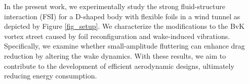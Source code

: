 \documentclass[a4paper,11pt]{article}
\begin{document}
	
	In the present work, we experimentally study the strong fluid-structure interaction (FSI) for a D-shaped body with flexible foils in a wind tunnel as depicted by Figure \ref{fig_setup}. We characterize the modifications to the BvK vortex street caused by foil reconfiguration and wake-induced vibrations. Specifically, we examine whether small-amplitude fluttering can enhance drag reduction by altering the wake dynamics. With these results, we aim to contribute to the development of efficient aerodynamic designs, ultimately reducing energy consumption.
	
	

\begin{figure}
	
\begin{subfigure}[b]{.5\textwidth}
\end{subfigure}
\end{figure}
\end{document}
